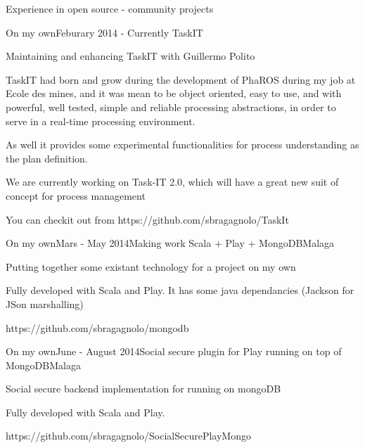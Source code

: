 \documentclass{resume} %
\begin{document}
\begin{rSection}{Experience in open source - community projects}
\begin{rSubsection}{On my own}{Feburary 2014 - Currently }{TaskIT}
\item Maintaining and enhancing TaskIT with Guillermo Polito
\item TaskIT had born and grow during the development of PhaROS during my job at Ecole des mines, and it was mean to be object oriented, easy to use, and with powerful, well tested, simple and reliable processing abstractions, in order to serve in a real-time processing environment. 
\item As well it provides some experimental functionalities for process understanding as the plan definition. 
\item We are currently working on Task-IT 2.0, which will have a great new suit of concept for process management
\item You can checkit out from https://github.com/sbragagnolo/TaskIt
\end{rSubsection}



\begin{rSubsection}{On my own}{Mars - May 2014}{Making work Scala + Play + MongoDB}{Malaga}
	\item Putting together some existant technology for a project on my own
	\item Fully developed with Scala and Play. It has some java dependancies (Jackson for JSon marshalling)
	\item https://github.com/sbragagnolo/mongodb
\end{rSubsection}

\begin{rSubsection}{On my own}{June - August 2014}{Social secure plugin for Play running on top of MongoDB}{Malaga}
	\item Social secure backend implementation for running on mongoDB
	\item Fully developed with Scala and Play. 
	\item https://github.com/sbragagnolo/SocialSecurePlayMongo
\end{rSubsection}



\end{rSection}
\end{document}
